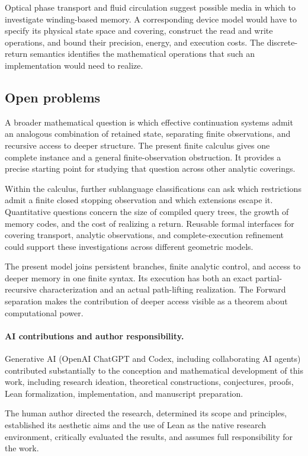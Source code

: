 \documentclass[11pt]{article}
\numberwithin{equation}{section}
\theoremstyle{definition}
\theoremstyle{remark}
\begin{document}
Optical phase transport and fluid circulation suggest possible media
in which to investigate winding-based memory. A corresponding device
model would have to specify its physical state space and covering,
construct the read and write operations, and bound their precision,
energy, and execution costs. The discrete-return semantics identifies
the mathematical operations that such an implementation would need
to realize.

\subsection{Open problems}

A broader mathematical question is which effective continuation
systems admit an analogous combination of retained state, separating
finite observations, and recursive access to deeper structure.
The present finite calculus gives one complete instance and a general
finite-observation obstruction. It provides a precise starting point
for studying that question across other analytic coverings.

Within the calculus, further sublanguage classifications can ask which
restrictions admit a finite closed stopping observation and which
extensions escape it. Quantitative questions concern the size of
compiled query trees, the growth of memory codes, and the cost of
realizing a return. Reusable formal interfaces for covering transport,
analytic observations, and complete-execution refinement could support
these investigations across different geometric models.

The present model joins persistent branches, finite analytic control,
and access to deeper memory in one finite syntax. Its execution has
both an exact partial-recursive characterization and an actual
path-lifting realization. The Forward separation makes the contribution
of deeper access visible as a theorem about computational power.

\paragraph{AI contributions and author responsibility.}
Generative AI (OpenAI ChatGPT and Codex, including collaborating AI
agents) contributed substantially to the conception and mathematical
development of this work, including research ideation, theoretical
constructions, conjectures, proofs, Lean formalization, implementation,
and manuscript preparation.

The human author directed the research, determined its scope and
principles, established its aesthetic aims and the use of Lean as the
native research environment, critically evaluated the results, and
assumes full responsibility for the work.
\end{document}
